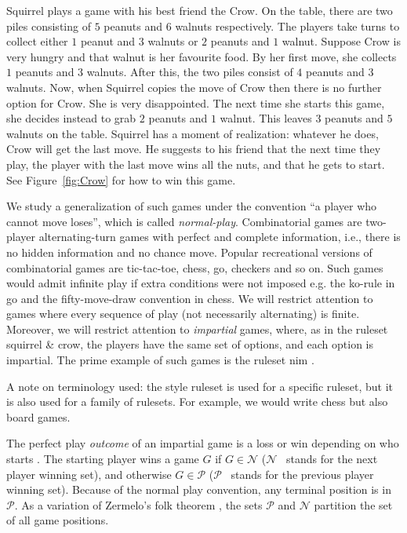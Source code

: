 \documentclass{amsart}
\theoremstyle{plain}
\theoremstyle{definition}
\newcommand{\N}{\ensuremath{\mathcal N}}
\renewcommand{\P}{\ensuremath{\mathcal P}}
\begin{document}
Squirrel plays a game with his best friend the Crow. On the table, there are two piles consisting of  $5$ peanuts and $6$ walnuts respectively. The players take turns to collect either $1$ peanut and $3$ walnuts or $2$ peanuts and $1$ walnut.
Suppose Crow is very hungry and that walnut is her favourite food. By her first move, she collects $1$ peanuts and $3$ walnuts. After this, the two piles consist of $4$ peanuts and $3$ walnuts. Now, when Squirrel copies the move of Crow then there is no further option for Crow. She is very disappointed. The next time she starts this game, she decides instead to grab $2$ peanuts and $1$ walnut. This leaves $3$ peanuts and $5$ walnuts on the table. Squirrel has a moment of realization: whatever he does, Crow will get the last move. He suggests to his friend that the next time they play, the player with the last move wins all the nuts, and that he gets to start. See Figure~\ref{fig:Crow} for how to win this game. 

We study a generalization of such games under the convention ``a player who cannot move loses'', which is called {\em normal-play}. Combinatorial games are two-player alternating-turn games with perfect and complete information, i.e., there is no hidden information and no chance move. 
  Popular recreational versions of combinatorial games are {\sc tic-tac-toe}, {\sc chess}, {\sc go}, {\sc checkers} and so on. Such games would admit infinite play if extra conditions were not imposed e.g. the ko-rule in {\sc go} and the fifty-move-draw convention in {\sc chess}. We will restrict attention to games where every sequence of play (not necessarily alternating) is finite. Moreover, we will restrict attention to {\em impartial} games, where, as in the ruleset {\sc squirrel \& crow}, the players have the same set of options, and each option is impartial. The prime example of such games is the ruleset  {\sc nim} \cite{bouton1901nim}. 
  
  A note on terminology used: the style {\sc ruleset} is used for a specific ruleset, but it is also used for a {\sc family of rulesets}. For example, we would write {\sc chess} but also {\sc board games}.

The perfect play {\em  outcome} of an impartial game is a loss or win depending on who starts \cite{berlekamp2004winning}. The starting player wins a game $G$ if $G\in\N$ (\N~ stands for the next player winning set), and otherwise $G\in \P$  (\P~ stands for the previous player winning set). Because of the normal play convention, any terminal position is in \P. As a variation of Zermelo's folk theorem \cite{zermelo1913anwendung}, the sets $\P$ and $\N$ partition the set of all game positions. 
\end{document}
